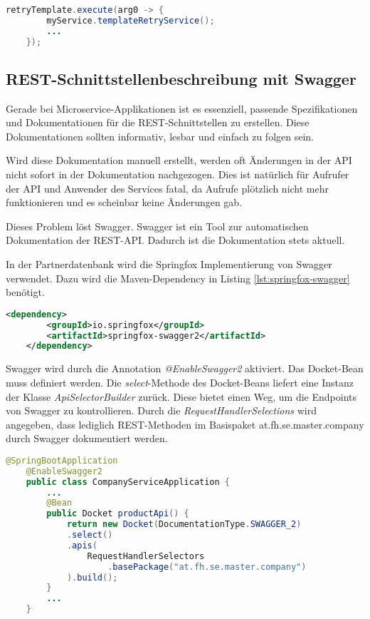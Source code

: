 \begin{lstlisting}[language=java, caption=Aufruf mittels Lambda-Expression, label=lst:lambda]
	retryTemplate.execute(arg0 -> {
		myService.templateRetryService();
		...
	});
\end{lstlisting}


\subsection{REST-Schnittstellenbeschreibung mit Swagger}
Gerade bei Microservice-Applikationen ist es essenziell, passende Spezifikationen und Dokumentationen für die REST-Schnittstellen zu erstellen. Diese Dokumentationen sollten informativ, lesbar und einfach zu folgen sein. 

Wird diese Dokumentation manuell erstellt, werden oft Änderungen in der API nicht sofort in der Dokumentation nachgezogen. Dies ist natürlich für Aufrufer der API und Anwender des Services fatal, da Aufrufe plötzlich nicht mehr funktionieren und es scheinbar keine Änderungen gab.

Dieses Problem löst Swagger. Swagger ist ein Tool zur automatischen Dokumentation der REST-API. Dadurch ist die Dokumentation stets aktuell.

In der Partnerdatenbank wird die Springfox Implementierung von Swagger verwendet. Dazu wird die Maven-Dependency in Listing \ref{lst:springfox-swagger} benötigt.
\begin{lstlisting}[language=xml, caption=pom.xml, label=lst:springfox-swagger]
	<dependency>
		<groupId>io.springfox</groupId>
		<artifactId>springfox-swagger2</artifactId>
	</dependency>
\end{lstlisting}


Swagger wird durch die Annotation \textit{@EnableSwagger2} aktiviert. Das Docket-Bean muss definiert werden. Die \textit{select}-Methode des Docket-Beans liefert eine Instanz der Klasse \textit{ApiSelectorBuilder} zurück. Diese bietet einen Weg, um die Endpoints von Swagger zu kontrollieren. Durch die \textit{RequestHandlerSelections} wird angegeben, dass lediglich REST-Methoden im Basispaket \glqq at.fh.se.master.company\grqq{} durch Swagger dokumentiert werden.
\begin{lstlisting}[language=java, caption=Swagger-Konfiguration, label=lst:swaggerconf]
	@SpringBootApplication
	@EnableSwagger2
	public class CompanyServiceApplication {
		...
		@Bean
		public Docket productApi() {
			return new Docket(DocumentationType.SWAGGER_2)
			.select()
			.apis(
				RequestHandlerSelectors
					.basePackage("at.fh.se.master.company")
			).build();
		}
		...
	}
\end{lstlisting}

